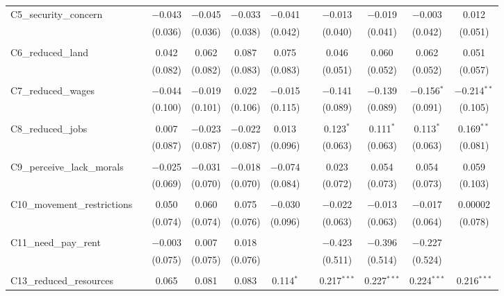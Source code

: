 \begin{table}[H]
\begin{tabular}{@{\extracolsep{4pt}}lcccccccccc}
 C5\_security\_concern &  & $-$0.043 & $-$0.045 & $-$0.033 & $-$0.041 &  & $-$0.013 & $-$0.019 & $-$0.003 & 0.012 \\ 
  &  & (0.036) & (0.036) & (0.038) & (0.042) &  & (0.040) & (0.041) & (0.042) & (0.051) \\ 
  & & & & & & & & & & \\ 
 C6\_reduced\_land &  & 0.042 & 0.062 & 0.087 & 0.075 &  & 0.046 & 0.060 & 0.062 & 0.051 \\ 
  &  & (0.082) & (0.082) & (0.083) & (0.083) &  & (0.051) & (0.052) & (0.052) & (0.057) \\ 
  & & & & & & & & & & \\ 
 C7\_reduced\_wages &  & $-$0.044 & $-$0.019 & 0.022 & $-$0.015 &  & $-$0.141 & $-$0.139 & $-$0.156$^{*}$ & $-$0.214$^{**}$ \\ 
  &  & (0.100) & (0.101) & (0.106) & (0.115) &  & (0.089) & (0.089) & (0.091) & (0.105) \\ 
  & & & & & & & & & & \\ 
 C8\_reduced\_jobs &  & 0.007 & $-$0.023 & $-$0.022 & 0.013 &  & 0.123$^{*}$ & 0.111$^{*}$ & 0.113$^{*}$ & 0.169$^{**}$ \\ 
  &  & (0.087) & (0.087) & (0.087) & (0.096) &  & (0.063) & (0.063) & (0.063) & (0.081) \\ 
  & & & & & & & & & & \\ 
 C9\_perceive\_lack\_morals &  & $-$0.025 & $-$0.031 & $-$0.018 & $-$0.074 &  & 0.023 & 0.054 & 0.054 & 0.059 \\ 
  &  & (0.069) & (0.070) & (0.070) & (0.084) &  & (0.072) & (0.073) & (0.073) & (0.103) \\ 
  & & & & & & & & & & \\ 
 C10\_movement\_restrictions &  & 0.050 & 0.060 & 0.075 & $-$0.030 &  & $-$0.022 & $-$0.013 & $-$0.017 & 0.00002 \\ 
  &  & (0.074) & (0.074) & (0.076) & (0.096) &  & (0.063) & (0.063) & (0.064) & (0.078) \\ 
  & & & & & & & & & & \\ 
 C11\_need\_pay\_rent &  & $-$0.003 & 0.007 & 0.018 &  &  & $-$0.423 & $-$0.396 & $-$0.227 &  \\ 
  &  & (0.075) & (0.075) & (0.076) &  &  & (0.511) & (0.514) & (0.524) &  \\ 
  & & & & & & & & & & \\ 
 C13\_reduced\_resources &  & 0.065 & 0.081 & 0.083 & 0.114$^{*}$ &  & 0.217$^{***}$ & 0.227$^{***}$ & 0.224$^{***}$ & 0.216$^{***}$ \\ 

\end{tabular}
\end{table}
